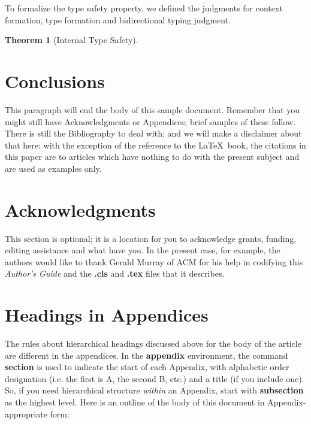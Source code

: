 \documentclass{sig-alternate}
\newtheorem{theorem}{Theorem}
\begin{document}
To formalize the type safety property, we defined the judgments for context formation, type formation and bidirectional typing judgment. 

\begin{theorem}[Internal Type Safety]

\end{theorem}


%



\section{Conclusions}
This paragraph will end the body of this sample document.
Remember that you might still have Acknowledgments or
Appendices; brief samples of these
follow.  There is still the Bibliography to deal with; and
we will make a disclaimer about that here: with the exception
of the reference to the \LaTeX\ book, the citations in
this paper are to articles which have nothing to
do with the present subject and are used as
examples only.

\section{Acknowledgments}
This section is optional; it is a location for you
to acknowledge grants, funding, editing assistance and
what have you.  In the present case, for example, the
authors would like to thank Gerald Murray of ACM for
his help in codifying this \textit{Author's Guide}
and the \textbf{.cls} and \textbf{.tex} files that it describes.

%

%
%
\appendix
\section{Headings in Appendices}
The rules about hierarchical headings discussed above for
the body of the article are different in the appendices.
In the \textbf{appendix} environment, the command
\textbf{section} is used to
indicate the start of each Appendix, with alphabetic order
designation (i.e. the first is A, the second B, etc.) and
a title (if you include one).  So, if you need
hierarchical structure
\textit{within} an Appendix, start with \textbf{subsection} as the
highest level. Here is an outline of the body of this
document in Appendix-appropriate form:
\end{document}
